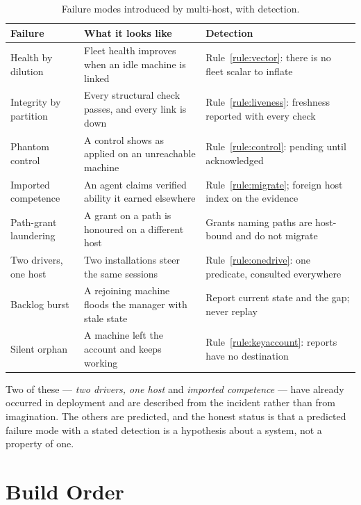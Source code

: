 \documentclass[11pt]{article}
\begin{document}
\begin{table}[h]
\centering\small
\caption{Failure modes introduced by multi-host, with detection.}
\label{tab:failures}
\begin{tabular}{@{}L{3.6cm}L{5.0cm}L{4.4cm}@{}}
\toprule
\textbf{Failure} & \textbf{What it looks like} & \textbf{Detection} \\
\midrule
Health by dilution & Fleet health improves when an idle machine is linked & Rule~\ref{rule:vector}: there is no fleet scalar to inflate \\
Integrity by partition & Every structural check passes, and every link is down & Rule~\ref{rule:liveness}: freshness reported with every check \\
Phantom control & A control shows as applied on an unreachable machine & Rule~\ref{rule:control}: pending until acknowledged \\
Imported competence & An agent claims verified ability it earned elsewhere & Rule~\ref{rule:migrate}; foreign host index on the evidence \\
Path-grant laundering & A grant on a path is honoured on a different host & Grants naming paths are host-bound and do not migrate \\
Two drivers, one host & Two installations steer the same sessions & Rule~\ref{rule:onedrive}: one predicate, consulted everywhere \\
Backlog burst & A rejoining machine floods the manager with stale state & Report current state and the gap; never replay \\
Silent orphan & A machine left the account and keeps working & Rule~\ref{rule:keyaccount}: reports have no destination \\
\bottomrule
\end{tabular}
\end{table}

Two of these --- \emph{two drivers, one host} and \emph{imported competence} --- have already occurred in deployment and are described from the incident rather than from imagination. The others are predicted, and the honest status is that a predicted failure mode with a stated detection is a hypothesis about a system, not a property of one.

\section{Build Order}
\label{sec:build}
\end{document}
